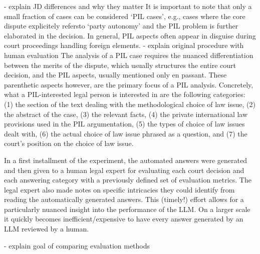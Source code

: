 \documentclass[a4paper,12pt]{article}
\begin{document}
	- explain JD differences and why they matter
It is important to note that only a small fraction of cases can be considered `PIL cases', e.g., cases where the core dispute explicitely refersto `party autonomy' and the PIL problem is further elaborated in the decision. In general, PIL aspects often appear in disguise during court proceedings handling foreign elements.
  - explain original procedure with human evaluation
The analysis of a PIL case requires the nuanced differentiation between the merits of the dispute, which usually structures the entire court decision, and the PIL aspects, usually mentioned only en passant. These parenthetic aspects however, are the primary focus of a PIL analysis. Concretely, what a PIL-interested legal person is interested in are the following categories: (1) the section of the text dealing with the methodological choice of law issue, (2) the abstract of the case, (3) the relevant facts, (4) the private international law provisions used in the PIL argumentation, (5) the types of choice of law issues dealt with, (6) the actual choice of law issue phrased as a question, and (7) the court's position on the choice of law issue.

In a first installment of the experiment, the automated answers were generated and then given to a human legal expert for evaluating each court decision and each answering category with a previously defined set of evaluation metrics. The legal expert also made notes on specific intricacies they could identify from reading the automatically generated answers. This (timely!) effort allows for a particularly nuanced insight into the performance of the LLM. On a larger scale it quickly becomes inefficient/expensive to have every answer generated by an LLM reviewed by a human.

- explain goal of comparing evaluation methods
\end{document}
